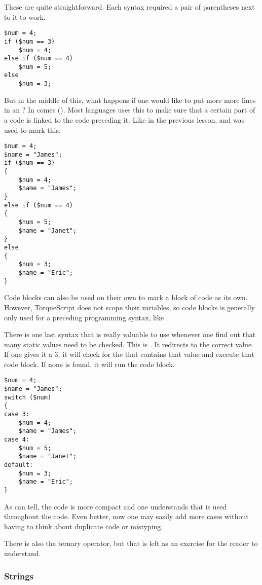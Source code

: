 These are quite straightforward. Each syntax required a pair of parentheses next to it to work.

\begin{lstlisting}[style=ts]
$num = 4;
if ($num == 3)
	$num = 4;
else if ($num == 4)
	$num = 5;
else
	$num = 3;
\end{lstlisting}

But in the middle of this, what happens if one would like to put more more lines in an ? In comes  (\code{\{\}}). Most languages uses this to make sure that a certain part of a code is linked to the code preceding it. Like in the previous lesson,  and  was used to mark this.

\begin{lstlisting}[style=ts]
$num = 4;
$name = "James";
if ($num == 3)
{
	$num = 4;
	$name = "James";
}
else if ($num == 4)
{
	$num = 5;
	$name = "Janet";
}
else
{
	$num = 3;
	$name = "Eric";
}
\end{lstlisting}

Code blocks can also be used on their own to mark a block of code as its own. However, TorqueScript does not scope their variables, so code blocks is generally only used for a preceding programming syntax, like .

There is one last syntax that is really valuable to use whenever one find out that many static values need to be checked. This is . It redirects to the correct value. If one gives it a 3, it will check for the  that contains that value and execute that code block. If none is found, it will run the  code block.

\begin{lstlisting}[style=ts]
$num = 4;
$name = "James";
switch ($num)
{
case 3:
	$num = 4;
	$name = "James";
case 4:
	$num = 5;
	$name = "Janet";
default:
	$num = 3;
	$name = "Eric";
}
\end{lstlisting}

As can tell, the code is more compact and one understands that  is used throughout the code. Even better, now one may easily add more cases without having to think about duplicate code or mistyping.

There is also the ternary operator, but that is left as an exercise for the reader to understand.

\subsubsection{Strings}


